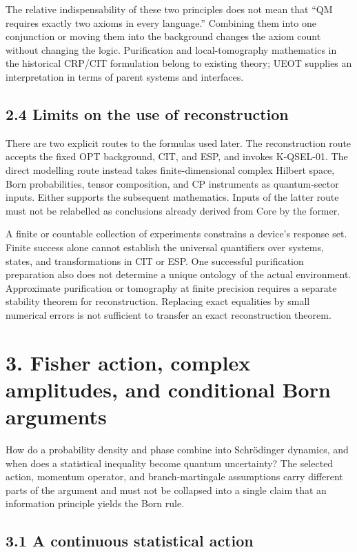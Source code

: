 \documentclass[
  11pt,
  oneside]{book}
\begin{document}
The relative indispensability of these two principles does not mean that
``QM requires exactly two axioms in every language.'' Combining them
into one conjunction or moving them into the background changes the
axiom count without changing the logic. Purification and
local-tomography mathematics in the historical CRP/CIT formulation
belong to existing theory; UEOT supplies an interpretation in terms of
parent systems and interfaces.

\section{2.4 Limits on the use of reconstruction}

There are two explicit routes to the formulas used later. The
reconstruction route accepts the fixed OPT background, CIT, and ESP, and
invokes K-QSEL-01. The direct modelling route instead takes
finite-dimensional complex Hilbert space, Born probabilities, tensor
composition, and CP instruments as quantum-sector inputs. Either
supports the subsequent mathematics. Inputs of the latter route must not
be relabelled as conclusions already derived from Core by the former.

A finite or countable collection of experiments constrains a device's
response set. Finite success alone cannot establish the universal
quantifiers over systems, states, and transformations in CIT or ESP. One
successful purification preparation also does not determine a unique
ontology of the actual environment. Approximate purification or
tomography at finite precision requires a separate stability theorem for
reconstruction. Replacing exact equalities by small numerical errors is
not sufficient to transfer an exact reconstruction theorem.

\chapter{3. Fisher action, complex amplitudes, and conditional Born
arguments}\label{ch-3}

How do a probability density and phase combine into Schrödinger
dynamics, and when does a statistical inequality become quantum
uncertainty? The selected action, momentum operator, and
branch-martingale assumptions carry different parts of the argument and
must not be collapsed into a single claim that an information principle
yields the Born rule.

\section{3.1 A continuous statistical action}
\end{document}
